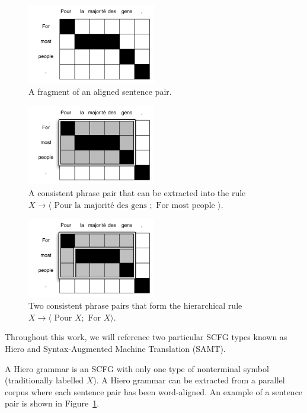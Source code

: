 \documentclass[11pt]{article}
\begin{document}
\begin{figure}[t]
\includegraphics[width=0.5\textwidth]{figures/aligned-sentence}
\caption{A fragment of an aligned sentence pair.\label{aligned-sentence}}
\end{figure}

\begin{figure}[t]
\includegraphics[width=0.5\textwidth]{figures/simple-rule}
\caption{A consistent phrase pair that can be extracted into the rule \\$X \to \langle \textrm{ Pour la majorit\'{e} des gens }; \textrm{ For most people } \rangle$.\label{hiero-rule}}
\end{figure}

\begin{figure}[t]
\includegraphics[width=0.5\textwidth]{figures/hierarchical-rule}
\caption{Two consistent phrase pairs that form the hierarchical rule $X \to \langle \textrm{ Pour } X ; \textrm{ For } X \rangle$.\label{hiero-rule-2}}
\end{figure}

Throughout this work, we will reference two particular SCFG types known as Hiero and Syntax-Augmented Machine Translation (SAMT).

A Hiero grammar \cite{Chiang2007} is an SCFG with only one type of
nonterminal symbol (traditionally labelled $X$).  A Hiero grammar can be extracted from a parallel corpus where each sentence pair has been word-aligned. An example of a sentence pair is shown in Figure~\ref{aligned-sentence}.
\end{document}
